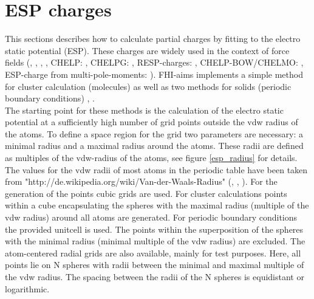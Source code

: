 \section{ESP charges}

This sections describes how to calculate partial charges by fitting to the electro static potential (ESP). These charges are 
widely used in the context of force fields (\cite{Momany1978}, \cite{Cox1981}, \cite{Singh1984}, \cite{Besler1990}, CHELP: 
\cite{Chirlian1987}, CHELPG: \cite{Breneman1990}, RESP-charges: \cite{Bayly1993}, CHELP-BOW/CHELMO: \cite{Sigfridsson1998}, 
ESP-charge from multi-pole-moments: \cite{Hu2007}). FHI-aims implements a simple method for cluster calculation (molecules) as well as 
two methods for solids (periodic boundary conditions) \cite{Campana2009}, \cite{Chen2010}.\\
The starting point for these methods is the calculation of the electro static potential at a sufficiently high number of grid points 
outside the vdw radius of the atoms. To define a space region for the grid two parameters are necessary: a minimal radius and a
maximal radius around the atoms. These radii are defined as multiples of the vdw-radius of the atoms, see figure \ref{esp_radius} 
for details. The values for the vdw radii of most atoms in the periodic table have been taken from 
"http://de.wikipedia.org/wiki/Van-der-Waals-Radius" (\cite{Bondi1964}, \cite{Rowland1996}, \cite{Mantina2009}). For the generation 
of the points cubic grids are used. For cluster calculations points within a cube encapsulating the spheres with the maximal radius (multiple of the vdw radius) around all atoms are generated. For periodic boundary conditions the provided unitcell is used. The points within the superposition of the spheres with the minimal radius (minimal multiple of the vdw radius) are excluded.  The atom-centered radial grids are also available, mainly for test purposes. Here, all points lie on N spheres with radii between the minimal and maximal multiple of the vdw radius. The spacing between the radii of the N spheres is equidistant or logarithmic.\\
